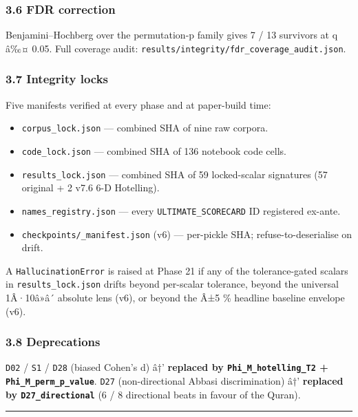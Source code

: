 \documentclass[
]{article}
\providecommand{\tightlist}{%
  \setlength{\itemsep}{0pt}\setlength{\parskip}{0pt}}
\begin{document}
\subsubsection{3.6 FDR correction}\label{fdr-correction}

Benjamini--Hochberg over the permutation-p family gives 7 / 13 survivors
at q â‰¤ 0.05. Full coverage audit:
\texttt{results/integrity/fdr\_coverage\_audit.json}.

\subsubsection{3.7 Integrity locks}\label{integrity-locks}

Five manifests verified at every phase and at paper-build time:

\begin{itemize}
\tightlist
\item
  \texttt{corpus\_lock.json} --- combined SHA of nine raw corpora.
\item
  \texttt{code\_lock.json} --- combined SHA of 136 notebook code cells.
\item
  \texttt{results\_lock.json} --- combined SHA of 59 locked-scalar
  signatures (57 original + 2 v7.6 6-D Hotelling).
\item
  \texttt{names\_registry.json} --- every \texttt{ULTIMATE\_SCORECARD}
  ID registered ex-ante.
\item
  \texttt{checkpoints/\_manifest.json} (v6) --- per-pickle SHA;
  refuse-to-deserialise on drift.
\end{itemize}

A \texttt{HallucinationError} is raised at Phase 21 if any of the
tolerance-gated scalars in \texttt{results\_lock.json} drifts beyond
per-scalar tolerance, beyond the universal 1Â·10â»â´ absolute lens (v6),
or beyond the Â±5 \% headline baseline envelope (v6).

\subsubsection{3.8 Deprecations}\label{deprecations}

\texttt{D02} / \texttt{S1} / \texttt{D28} (biased Cohen's d) â†'
\textbf{replaced by \texttt{Phi\_M\_hotelling\_T2} +
\texttt{Phi\_M\_perm\_p\_value}}. \texttt{D27} (non-directional Abbasi
discrimination) â†' \textbf{replaced by \texttt{D27\_directional}} (6 /
8 directional beats in favour of the Quran).

\begin{center}\rule{0.5\linewidth}{0.5pt}\end{center}
\end{document}
